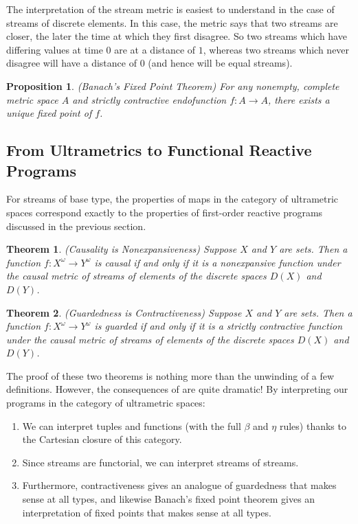 \documentclass[nocopyrightspace,preprint]{sigplanconf}
\newtheorem{prop}{Proposition}
\newtheorem{theorem}{Theorem}
\begin{document}
The interpretation of the stream metric is easiest to understand in
the case of streams of discrete elements. In this case, the metric
says that two streams are closer, the later the time at which they
first disagree. So two streams which have differing values at time $0$
are at a distance of $1$, whereas two streams which never disagree
will have a distance of $0$ (and hence will be equal streams).

\begin{prop}{(Banach's Fixed Point Theorem)}
For any nonempty, complete metric space $A$ and strictly contractive
endofunction $f : A \to A$, there exists a unique fixed point of $f$.
\end{prop}

\subsection{From Ultrametrics to Functional Reactive Programs}

For streams of base type, the properties of maps
in the category of ultrametric spaces correspond exactly to the
properties of first-order reactive programs discussed in the
previous section.

\begin{theorem}{(Causality is Nonexpansiveness)}
Suppose $X$ and $Y$ are sets. Then a function $f : X^\omega \to
Y^\omega$ is causal if and only if it is a nonexpansive function under
the causal metric of streams of elements of the discrete spaces $D(X)$
and $D(Y)$.
\end{theorem}

\begin{theorem}{(Guardedness is Contractiveness)}
Suppose $X$ and $Y$ are sets. Then a function $f : X^\omega \to
Y^\omega$ is guarded if and only if it is a strictly contractive
function under the causal metric of streams of elements of the
discrete spaces $D(X)$ and $D(Y)$.
\end{theorem}

The proof of these two theorems is nothing more than the unwinding of
a few definitions. However, the consequences of are quite dramatic! By
interpreting our programs in the category of ultrametric spaces:
\begin{enumerate}
\item We can interpret tuples and functions (with the full $\beta$ and
  $\eta$ rules) thanks to the Cartesian closure of this category.
\item Since streams are functorial, we can interpret streams of
  streams.
\item Furthermore, contractiveness gives an analogue of guardedness
  that makes sense at all types, and likewise Banach's fixed point
  theorem gives an interpretation of fixed points that makes sense at
  all types.
\end{enumerate}
\end{document}
